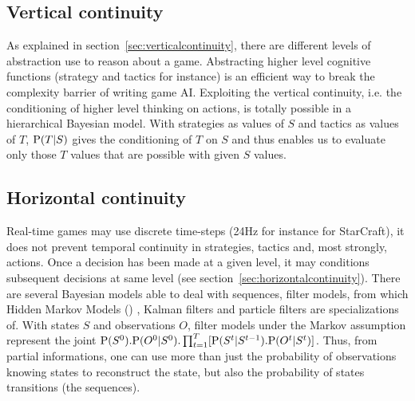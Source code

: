 \subsection{Vertical continuity}
As explained in section~\ref{sec:verticalcontinuity}, there are different levels of abstraction use to reason about a game. Abstracting higher level cognitive functions (strategy and tactics for instance) is an efficient way to break the complexity barrier of writing game AI. Exploiting the vertical continuity, i.e. the conditioning of higher level thinking on actions, is totally possible in a hierarchical Bayesian model. With strategies as values of $S$ and tactics as values of $T$, $\mathrm{P}(T|S)$ gives the conditioning of $T$ on $S$ and thus enables us to evaluate only those $T$ values that are possible with given $S$ values.

\subsection{Horizontal continuity}
Real-time games may use discrete time-steps (24Hz for instance for StarCraft), it does not prevent temporal continuity in strategies, tactics and, most strongly, actions. Once a decision has been made at a given level, it may conditions subsequent decisions at same level (see section~\ref{sec:horizontalcontinuity}). There are several Bayesian models able to deal with sequences, filter models, from which Hidden Markov Models () \citep{Rabiner}, Kalman filters \citep{Kalman1960} and particle filters \citep{particleFiltering} are specializations of. With states $S$ and observations $O$, filter models under the Markov assumption represent the joint $\mathrm{P}(S^0).\mathrm{P}(O^0|S^0).\prod_{t=1}^T[\mathrm{P}(S^t | S^{t-1}).\mathrm{P}(O^t|S^t)]$. Thus, from partial informations, one can use more than just the probability of observations knowing states to reconstruct the state, but also the probability of states transitions (the sequences).

